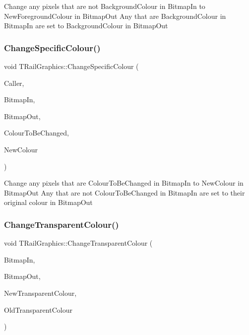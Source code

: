 Change any pixels that are not Background\+Colour in Bitmap\+In to New\+Foreground\+Colour in Bitmap\+Out Any that are Background\+Colour in Bitmap\+In are set to Background\+Colour in Bitmap\+Out \mbox{\label{class_t_rail_graphics_ac4e48e6ee19e01724adb0d490762d548}} 
\subsubsection{\texorpdfstring{Change\+Specific\+Colour()}{ChangeSpecificColour()}}
{\footnotesize\ttfamily void T\+Rail\+Graphics\+::\+Change\+Specific\+Colour (\begin{DoxyParamCaption}\item[{int}]{Caller,  }\item[{Graphics\+::\+T\+Bitmap $\ast$}]{Bitmap\+In,  }\item[{Graphics\+::\+T\+Bitmap $\ast$}]{Bitmap\+Out,  }\item[{T\+Color}]{Colour\+To\+Be\+Changed,  }\item[{T\+Color}]{New\+Colour }\end{DoxyParamCaption})}

Change any pixels that are Colour\+To\+Be\+Changed in Bitmap\+In to New\+Colour in Bitmap\+Out Any that are not Colour\+To\+Be\+Changed in Bitmap\+In are set to their original colour in Bitmap\+Out \mbox{\label{class_t_rail_graphics_a89a3e3a91129c4d02f4606478781b519}} 
\subsubsection{\texorpdfstring{Change\+Transparent\+Colour()}{ChangeTransparentColour()}}
{\footnotesize\ttfamily void T\+Rail\+Graphics\+::\+Change\+Transparent\+Colour (\begin{DoxyParamCaption}\item[{Graphics\+::\+T\+Bitmap $\ast$}]{Bitmap\+In,  }\item[{Graphics\+::\+T\+Bitmap $\ast$}]{Bitmap\+Out,  }\item[{T\+Color}]{New\+Transparent\+Colour,  }\item[{T\+Color}]{Old\+Transparent\+Colour }\end{DoxyParamCaption})}

